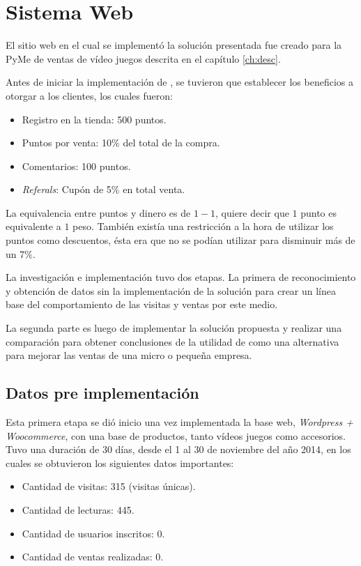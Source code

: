 \section{Sistema Web}
\label{cap_estudio}

El sitio web en el cual se implementó la solución presentada fue creado para la PyMe de
ventas de vídeo juegos descrita en el capítulo \ref{ch:desc}.

Antes de iniciar la implementación de {\gam}, se tuvieron que establecer los beneficios a otorgar a los 
clientes, los cuales fueron:

\begin{itemize}

\item Registro en la tienda: 500 puntos.
\item Puntos por venta: 10\% del total de la compra.
\item Comentarios: 100 puntos.
\item \emph{Referals}: Cupón de 5\% en total venta.

\end{itemize}

La equivalencia entre puntos y dinero es de $1-1$, quiere decir que $1$ punto es equivalente a 
$1$ peso. También existía una restricción a la hora de utilizar los puntos como descuentos, ésta 
era que no se podían utilizar para disminuir más de un 7\%.

La investigación e implementación tuvo dos etapas. La primera de reconocimiento y obtención de datos
 sin la implementación de la solución para crear un línea base del comportamiento de las visitas 
y ventas por este medio.

La segunda parte es luego de implementar la solución
propuesta y realizar una comparación para obtener conclusiones de la utilidad de
{\gam} como una alternativa para mejorar las ventas de una micro o pequeña empresa.

\subsection{Datos pre implementación {\gam}}

Esta primera etapa se dió inicio una vez implementada la base web,
\emph{Wordpress + Woocommerce}, con una base de productos, tanto vídeos juegos como
accesorios.
Tuvo una duración de 30 días, desde el 1 al 30 de noviembre del año 2014,
en los cuales se obtuvieron los siguientes datos importantes:


\begin{itemize}
    \item Cantidad de visitas: 315 (visitas únicas).
    \item Cantidad de lecturas: 445.
    \item Cantidad de usuarios inscritos: 0.
    \item Cantidad de ventas realizadas: 0.
\end{itemize}

